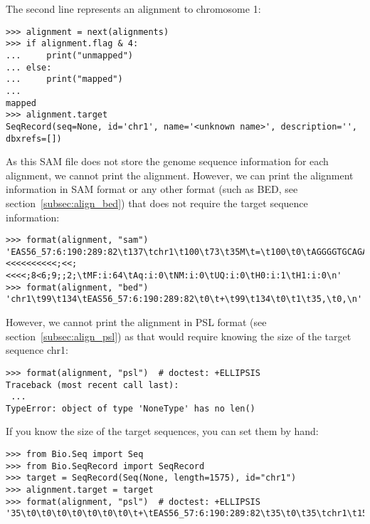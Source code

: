 The second line represents an alignment to chromosome 1:
\begin{verbatim}
>>> alignment = next(alignments)
>>> if alignment.flag & 4:
...     print("unmapped")
... else:
...     print("mapped")
...
mapped
>>> alignment.target
SeqRecord(seq=None, id='chr1', name='<unknown name>', description='', dbxrefs=[])
\end{verbatim}
As this SAM file does not store the genome sequence information for each alignment, we cannot print the alignment. However, we can print the alignment information in SAM format or any other format (such as BED, see section~\ref{subsec:align_bed}) that does not require the target sequence information:
\begin{verbatim}
>>> format(alignment, "sam")
'EAS56_57:6:190:289:82\t137\tchr1\t100\t73\t35M\t=\t100\t0\tAGGGGTGCAGAGCCGAGTCACGGGGTTGCCAGCAC\t<<<<<<;<<<<<<<<<<;<<;<<<<;8<6;9;;2;\tMF:i:64\tAq:i:0\tNM:i:0\tUQ:i:0\tH0:i:1\tH1:i:0\n'
>>> format(alignment, "bed")
'chr1\t99\t134\tEAS56_57:6:190:289:82\t0\t+\t99\t134\t0\t1\t35,\t0,\n'
\end{verbatim}
However, we cannot print the alignment in PSL format (see section~\ref{subsec:align_psl}) as that would require knowing the size of the target sequence chr1:
\begin{verbatim}
>>> format(alignment, "psl")  # doctest: +ELLIPSIS
Traceback (most recent call last):
 ...
TypeError: object of type 'NoneType' has no len()
\end{verbatim}
If you know the size of the target sequences, you can set them by hand:
\begin{verbatim}
>>> from Bio.Seq import Seq
>>> from Bio.SeqRecord import SeqRecord
>>> target = SeqRecord(Seq(None, length=1575), id="chr1")
>>> alignment.target = target
>>> format(alignment, "psl")  # doctest: +ELLIPSIS
'35\t0\t0\t0\t0\t0\t0\t0\t+\tEAS56_57:6:190:289:82\t35\t0\t35\tchr1\t1575\t99\t134\t1\t35,\t0,\t99,\n'
\end{verbatim}


